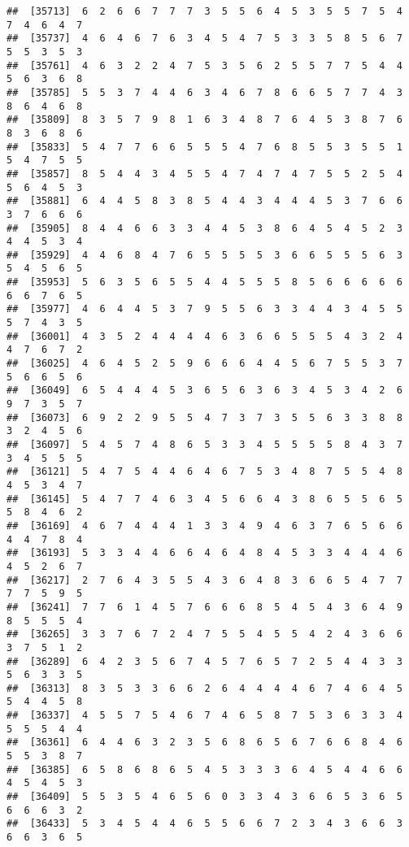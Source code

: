 \documentclass[
]{book}
\begin{document}
\begin{verbatim}
##  [35713]  6  2  6  6  7  7  7  3  5  5  6  4  5  3  5  5  7  5  4  7  4  6  4  7
##  [35737]  4  6  4  6  7  6  3  4  5  4  7  5  3  3  5  8  5  6  7  5  5  3  5  3
##  [35761]  4  6  3  2  2  4  7  5  3  5  6  2  5  5  7  7  5  4  4  5  6  3  6  8
##  [35785]  5  5  3  7  4  4  6  3  4  6  7  8  6  6  5  7  7  4  3  8  6  4  6  8
##  [35809]  8  3  5  7  9  8  1  6  3  4  8  7  6  4  5  3  8  7  6  8  3  6  8  6
##  [35833]  5  4  7  7  6  6  5  5  5  4  7  6  8  5  5  3  5  5  1  5  4  7  5  5
##  [35857]  8  5  4  4  3  4  5  5  4  7  4  7  4  7  5  5  2  5  4  5  6  4  5  3
##  [35881]  6  4  4  5  8  3  8  5  4  4  3  4  4  4  5  3  7  6  6  3  7  6  6  6
##  [35905]  8  4  4  6  6  3  3  4  4  5  3  8  6  4  5  4  5  2  3  4  4  5  3  4
##  [35929]  4  4  6  8  4  7  6  5  5  5  5  3  6  6  5  5  5  6  3  5  4  5  6  5
##  [35953]  5  6  3  5  6  5  5  4  4  5  5  5  8  5  6  6  6  6  6  6  6  7  6  5
##  [35977]  4  6  4  4  5  3  7  9  5  5  6  3  3  4  4  3  4  5  5  5  7  4  3  5
##  [36001]  4  3  5  2  4  4  4  4  6  3  6  6  5  5  5  4  3  2  4  4  7  6  7  2
##  [36025]  4  6  4  5  2  5  9  6  6  6  4  4  5  6  7  5  5  3  7  5  6  6  5  6
##  [36049]  6  5  4  4  4  5  3  6  5  6  3  6  3  4  5  3  4  2  6  9  7  3  5  7
##  [36073]  6  9  2  2  9  5  5  4  7  3  7  3  5  5  6  3  3  8  8  3  2  4  5  6
##  [36097]  5  4  5  7  4  8  6  5  3  3  4  5  5  5  5  8  4  3  7  3  4  5  5  5
##  [36121]  5  4  7  5  4  4  6  4  6  7  5  3  4  8  7  5  5  4  8  4  5  3  4  7
##  [36145]  5  4  7  7  4  6  3  4  5  6  6  4  3  8  6  5  5  6  5  5  8  4  6  2
##  [36169]  4  6  7  4  4  4  1  3  3  4  9  4  6  3  7  6  5  6  6  4  4  7  8  4
##  [36193]  5  3  3  4  4  6  6  4  6  4  8  4  5  3  3  4  4  4  6  4  5  2  6  7
##  [36217]  2  7  6  4  3  5  5  4  3  6  4  8  3  6  6  5  4  7  7  7  7  5  9  5
##  [36241]  7  7  6  1  4  5  7  6  6  6  8  5  4  5  4  3  6  4  9  8  5  5  5  4
##  [36265]  3  3  7  6  7  2  4  7  5  5  4  5  5  4  2  4  3  6  6  3  7  5  1  2
##  [36289]  6  4  2  3  5  6  7  4  5  7  6  5  7  2  5  4  4  3  3  5  6  3  3  5
##  [36313]  8  3  5  3  3  6  6  2  6  4  4  4  4  6  7  4  6  4  5  5  4  4  5  8
##  [36337]  4  5  5  7  5  4  6  7  4  6  5  8  7  5  3  6  3  3  4  5  5  5  4  4
##  [36361]  6  4  4  6  3  2  3  5  6  8  6  5  6  7  6  6  8  4  6  5  5  3  8  7
##  [36385]  6  5  8  6  8  6  5  4  5  3  3  3  6  4  5  4  4  6  6  4  5  4  5  3
##  [36409]  5  5  3  5  4  6  5  6  0  3  3  4  3  6  6  5  3  6  5  6  6  6  3  2
##  [36433]  5  3  4  5  4  4  6  5  5  6  6  7  2  3  4  3  6  6  3  6  6  3  6  5

\end{verbatim}
\end{document}
